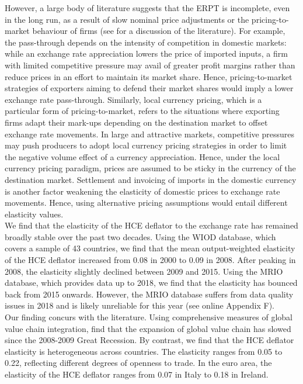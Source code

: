 \documentclass[11pt,a4paper]{article}
\begin{document}
However, a large body of literature suggests that the ERPT is incomplete, even in the long run, as a result of slow nominal price adjustments or the pricing-to-market behaviour of firms (see \cite{Ozyurt2016} for a discussion of the literature).
For example, the pass-through depends on the intensity of competition in domestic markets: while an exchange rate appreciation lowers the price of imported inputs, a ﬁrm with limited competitive pressure may avail of greater proﬁt margins rather than reduce prices in an eﬀort to maintain its market share.
Hence, pricing-to-market strategies of exporters aiming to defend their market shares would imply a lower exchange rate pass-through.
Similarly, local currency pricing, which is a particular form of pricing-to-market, refers to the situations where exporting firms adapt their mark-ups depending on the destination market to offset exchange rate movements. 
In large and attractive markets, competitive pressures may push producers to adopt local currency pricing strategies in order to limit the negative volume effect of a currency appreciation. 
Hence, under the local currency pricing paradigm, prices are assumed to be sticky in the currency of the destination
market.
Settlement and invoicing of imports in the domestic currency is another factor weakening the elasticity of domestic prices to exchange rate movements.
Hence, using alternative pricing assumptions would entail different elasticity values. \\
We find that the elasticity of the HCE deflator to the exchange rate has remained broadly stable over the past two decades. 
Using the WIOD database, which covers a sample of 43 countries, we find that the mean output-weighted elasticity of the HCE deflator increased from 0.08 in 2000 to 0.09 in 2008. 
After peaking in 2008, the elasticity slightly declined between 2009 and 2015. 
Using the MRIO database, which provides data up to 2018, we find that the elasticity has bounced back from 2015 onwards. However, the MRIO database suffers from data quality issues in 2018 and is likely unreliable for this year (see online Appendix F).\\
Our finding concurs with the literature.
Using comprehensive measures of global value chain integration, \cite{Timmer2016} find that the expansion of global value chain has slowed since the 2008-2009 Great Recession.
By contrast, we find that the HCE deflator elasticity is heterogeneous across countries. 
The elasticity ranges from 0.05 to 0.22, reflecting different degrees of openness to trade. 
In the euro area, the elasticity of the HCE deflator ranges from 0.07 in Italy to 0.18 in Ireland. %
\end{document}
